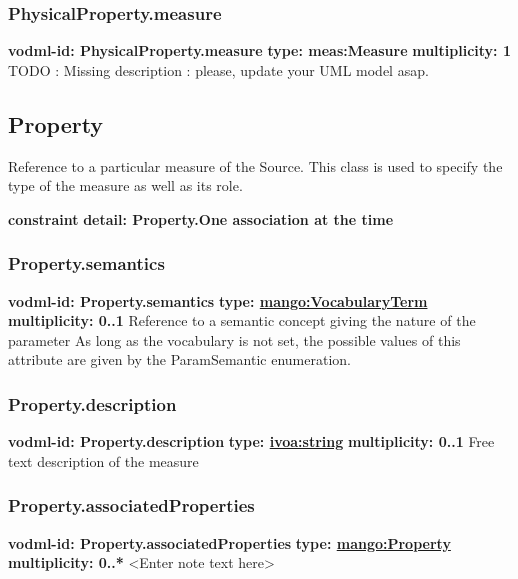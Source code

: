     \subsubsection{PhysicalProperty.measure}
      \textbf{vodml-id: PhysicalProperty.measure} \newline
      \textbf{type: meas:Measure} \newline
      \textbf{multiplicity: 1} \newline
      TODO : Missing description : please, update your UML model asap.

  \subsection{Property}
  \label{sect:Property}
    Reference to a particular measure of the Source. This class is used to specify the type of the measure as well as its role.

    \noindent \textbf{constraint} \newline
    \indent    \textbf{detail: Property.One association at the time
 }\newline


    \subsubsection{Property.semantics}
      \textbf{vodml-id: Property.semantics} \newline
      \textbf{type: \hyperref[sect:VocabularyTerm]{mango:VocabularyTerm}} \newline
      \textbf{multiplicity: 0..1} \newline
      Reference to a semantic concept giving the nature of the parameter As long as the vocabulary is not set, the possible values of this attribute are given by the ParamSemantic enumeration.

    \subsubsection{Property.description}
      \textbf{vodml-id: Property.description} \newline
      \textbf{type: \hyperref[sect:ivoa]{ivoa:string}} \newline
      \textbf{multiplicity: 0..1} \newline
      Free text description of the measure

    \subsubsection{Property.associatedProperties}
      \textbf{vodml-id: Property.associatedProperties} \newline
      \textbf{type: \hyperref[sect:Property]{mango:Property}} \newline
      \textbf{multiplicity: 0..*} \newline
      <Enter note text here>

